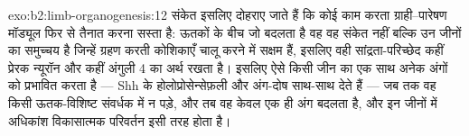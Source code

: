 \begin{solution}{exo:b2:limb-organogenesis:12}
संकेत इसलिए दोहराए जाते हैं कि कोई काम करता ग्राही--पारेषण मॉड्यूल
फिर से तैनात करना सस्ता है: ऊतकों के बीच जो बदलता है वह वह
संकेत नहीं बल्कि उन जीनों का समुच्चय है जिन्हें ग्रहण करती कोशिकाएँ चालू
करने में सक्षम हैं, इसलिए वही सांद्रता-परिच्छेद कहीं प्रेरक न्यूरॉन और
कहीं अंगुली 4 का अर्थ रखता है। इसलिए ऐसे किसी जीन का 
एक साथ अनेक अंगों को प्रभावित करता है --- Shh के 
होलोप्रोसेन्सेफ़ली और अंग-दोष साथ-साथ देते हैं --- जब तक वह किसी
ऊतक-विशिष्ट संवर्धक में न पड़े, और तब वह केवल एक ही अंग बदलता है,
और इन जीनों में अधिकांश विकासात्मक परिवर्तन इसी तरह होता है।
\end{solution}

